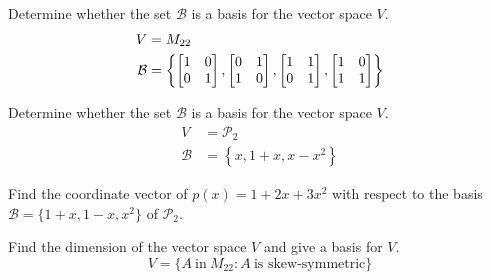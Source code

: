 \documentclass[oneperpage]{gsypset}
\begin{document}
	\begin{problem}[6.2.20]
		Determine whether the set $\mathcal{B}$ is a basis for the vector space $V$.
		\begin{align*}
			V &= M_{22} \\
			\mathcal{B} &= \left\{
					\begin{bmatrix}1&0\\0&1\end{bmatrix},
					\begin{bmatrix}0&1\\1&0\end{bmatrix},
					\begin{bmatrix}1&1\\0&1\end{bmatrix},
					\begin{bmatrix}1&0\\1&1\end{bmatrix}
				\right\}
		\end{align*}
	\end{problem}
	\begin{solution}
		
	\end{solution}
	
	\begin{problem}[6.2.25]
		Determine whether the set $\mathcal{B}$ is a basis for the vector space $V$.
		\begin{align*}
			V &= \mathscr{P}_2 \\
			\mathcal{B} &= \left\{
					x,
					1+x,
					x-x^2
				\right\}
		\end{align*}
	\end{problem}
	\begin{solution}
		
	\end{solution}
	
	\begin{problem}[6.2.28]
		Find the coordinate vector of $p(x) = 1 + 2x + 3x^2$ with respect to the basis 
		$\mathcal{B}=\{1+x,1-x,x^2\}$ of $\mathscr{P}_2$.
	\end{problem}
	\begin{solution}
		
	\end{solution}
	
	\begin{problem}[6.2.38]
		Find the dimension of the vector space $V$ and give a basis for $V$.
		\[
			V = \{A\ \text{in}\ M_{22} \colon A\ \text{is skew-symmetric}\}
		\]
	\end{problem}
	\begin{solution}
		
	\end{solution}
	
\end{document}

